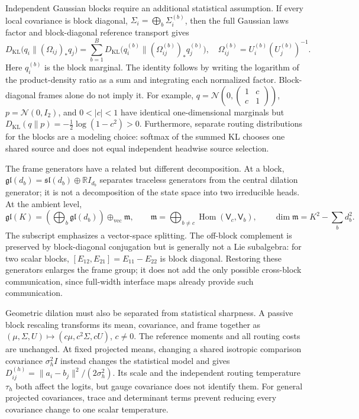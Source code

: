 \documentclass[twoside,11pt]{article}
\begin{document}
Independent Gaussian blocks require an additional statistical assumption. If every local covariance is block diagonal, $\Sigma_i=\bigoplus_b\Sigma_i^{(b)}$, then the full Gaussian laws factor and block-diagonal reference transport gives
\begin{equation}
D_{\mathrm{KL}}\bigl(q_i\|(\Omega_{ij})_*q_j\bigr)
=\sum_{b=1}^{B}D_{\mathrm{KL}}\bigl(q_i^{(b)}\|(\Omega_{ij}^{(b)})_*q_j^{(b)}\bigr),
\quad \Omega_{ij}^{(b)}=U_i^{(b)}(U_j^{(b)})^{-1}.
\label{eq:irrep_block_kl_additivity}
\end{equation}
Here $q_i^{(b)}$ is the block marginal. The identity follows by writing the logarithm of the product-density ratio as a sum and integrating each normalized factor. Block-diagonal frames alone do not imply it. For example, $q=\mathcal N(0,\left(\begin{smallmatrix}1&c\\c&1\end{smallmatrix}\right))$, $p=\mathcal N(0,I_2)$, and $0<|c|<1$ have identical one-dimensional marginals but $D_{\mathrm{KL}}(q\|p)=-\tfrac12\log(1-c^2)>0$. Furthermore, separate routing distributions for the blocks are a modeling choice: softmax of the summed KL chooses one shared source and does not equal independent headwise source selection.

The frame generators have a related but different decomposition. At a block, $\mathfrak{gl}(d_b)=\mathfrak{sl}(d_b)\oplus\mathbb RI_{d_b}$ separates traceless generators from the central dilation generator; it is not a decomposition of the state space into two irreducible heads. At the ambient level,
\begin{equation}
\mathfrak{gl}(K)=\left(\bigoplus_b\mathfrak{gl}(d_b)\right)
\oplus_{\mathrm{vec}}\mathfrak m,\qquad
\mathfrak m=\bigoplus_{b\ne c}\operatorname{Hom}(\mathsf V_c,\mathsf V_b),\qquad
\dim\mathfrak m=K^2-\sum_bd_b^2.
\label{eq:off_block_vector_complement}
\end{equation}
The subscript emphasizes a vector-space splitting. The off-block complement is preserved by block-diagonal conjugation but is generally not a Lie subalgebra: for two scalar blocks, $[E_{12},E_{21}]=E_{11}-E_{22}$ is block diagonal. Restoring these generators enlarges the frame group; it does not add the only possible cross-block communication, since full-width interface maps already provide such communication.

Geometric dilation must also be separated from statistical sharpness. A passive block rescaling transforms its mean, covariance, and frame together as $(\mu,\Sigma,U)\mapsto(c\mu,c^2\Sigma,cU)$, $c\ne0$. The reference moments and all routing costs are unchanged. At fixed projected means, changing a shared isotropic comparison covariance $\sigma_h^2I$ instead changes the statistical model and gives $D_{ij}^{(h)}=\|a_i-b_j\|^2/(2\sigma_h^2)$. Its scale and the independent routing temperature $\tau_h$ both affect the logits, but gauge covariance does not identify them. For general projected covariances, trace and determinant terms prevent reducing every covariance change to one scalar temperature.
\end{document}
